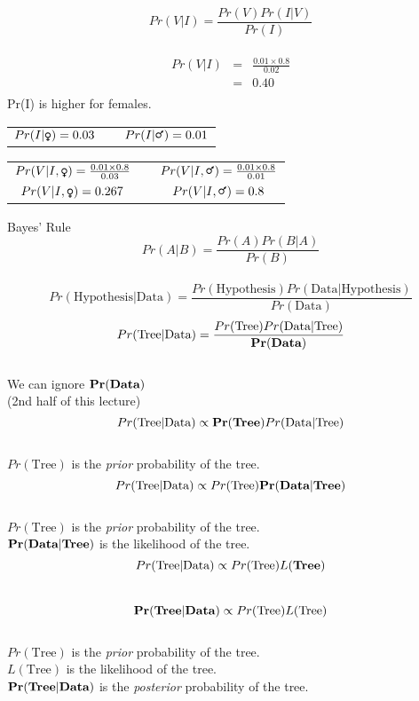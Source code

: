 \documentclass{seminar}
\begin{document}
\begin{slide}
\newslide
\[ Pr(V|I) = \frac{Pr(V) Pr(I|V)}{Pr(I)}\]
\\[15pt]
\begin{eqnarray*}
Pr(V|I) &= & \frac{0.01\times 0.8}{0.02} \\[15pt]
	& = & 0.40 \\
\end{eqnarray*}
\newslide
Pr(I) is higher for females.
\begin{tabular}{ccc}
$Pr(I | \mbox{\Female}) = 0.03$ & &$Pr(I|\mbox{\Male}) = 0.01$\\[45pt]
\end{tabular}

\begin{tabular}{ccc}
$Pr(V|I,\mbox{\Female}) =  \frac{0.01\times 0.8}{0.03}$&\vline &$Pr(V|I,\mbox{\Male}) =  \frac{0.01\times 0.8}{0.01}$ \\[15pt]
$Pr(V|I,\mbox{\Female}) =  0.267$& \vline&$Pr(V|I,\mbox{\Male}) =  0.8$ \\[15pt]
\end{tabular}

\newslide
\Large Bayes' Rule\\[45pt]
\[Pr(A|B) = \frac{Pr(A)Pr(B|A)}{Pr(B)}\]\\[45pt]\large
\[Pr(\mbox{Hypothesis}|\mbox{Data}) = \frac{Pr(\mbox{Hypothesis})Pr(\mbox{Data}|\mbox{Hypothesis})}{Pr(\mbox{Data})}\]
\newslide
\[Pr(\mbox{Tree}|\mbox{Data}) = \frac{Pr(\mbox{Tree})Pr(\mbox{Data}|\mbox{Tree})}{\bf Pr(\mbox{\bf Data})}\]\\[15pt]
We can ignore ${\bf Pr(\mbox{\bf Data})}$ \\[15pt]
(2nd half of this lecture)
\newslide
\[Pr(\mbox{Tree}|\mbox{Data}) \propto {\bf Pr(\mbox{\bf Tree})}Pr(\mbox{Data}|\mbox{Tree})\]\\[30pt]
$Pr(\mbox{Tree})$ is the {\em prior} probability of the tree.\\[15pt]
\newslide
\[Pr(\mbox{Tree}|\mbox{Data}) \propto Pr(\mbox{Tree}) {\bf Pr(\mbox{\bf Data}|\mbox{\bf Tree}) }\]\\[30pt]
$Pr(\mbox{Tree})$ is the {\em prior} probability of the tree.\\[15pt]
${\bf Pr(\mbox{\bf Data}|\mbox{\bf Tree}) }$ is the likelihood of the tree.\\[30pt]
\[Pr(\mbox{Tree}|\mbox{Data}) \propto Pr(\mbox{Tree}) L(\mbox{\bf Tree}) \]\\[30pt]
\newslide
\[{\bf Pr(\mbox{\bf Tree}|\mbox{\bf Data}) } \propto Pr(\mbox{Tree})L(\mbox{Tree})\]\\[30pt]
$Pr(\mbox{Tree})$ is the {\em prior} probability of the tree.\\[15pt]
 $L(\mbox{Tree})$ is the likelihood of the tree.\\[15pt]
${\bf Pr(\mbox{\bf Tree}|\mbox{\bf Data}) }$ is the {\em posterior} probability of the tree.\\[15pt]


\end{slide}
\end{document}
